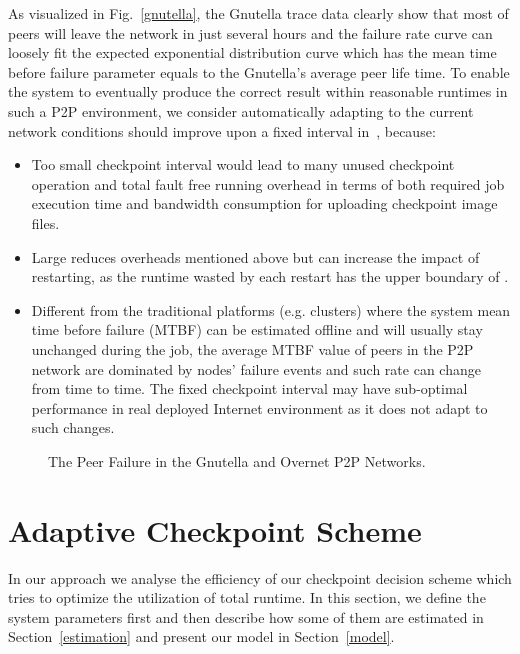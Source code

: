 \documentclass[times, 12pt, onecolumn]{article}
\newcommand{\refsec}[1]{Section~\ref{#1}}
\newcommand{\reffig}[1]{Fig.~\ref{#1}}
\begin{document}
As visualized in \reffig{gnutella}, the Gnutella trace data clearly show that most of peers 
will leave the network in just several hours and the failure rate curve can loosely fit the 
expected exponential distribution curve which has the mean time before failure parameter 
equals to the Gnutella's average peer life time. 
To enable the system to eventually produce the correct result within reasonable runtimes in such a
P2P environment, we consider automatically adapting to the current network conditions should improve upon
a fixed interval in~\cite{dvm}, because:
\begin{itemize}
\item Too small checkpoint interval  would lead to many unused checkpoint operation and total 
fault free running overhead in terms of both required job execution time and bandwidth consumption for
uploading checkpoint image files. 
\item Large  reduces overheads mentioned above but can increase the impact of restarting, as the
runtime wasted by each restart has the upper boundary of .
\item Different from the traditional platforms (e.g. clusters) where the system mean time before failure 
(MTBF) can be estimated offline and will usually stay unchanged during the job, the average MTBF value of 
peers in the P2P network are dominated by nodes' failure events and such rate can change from time to time. 
The fixed checkpoint interval  may have sub-optimal performance in real deployed Internet environment as it 
does not adapt to such changes. 
\end{itemize}

\begin{figure*}
\centering
{}
\caption{The Peer Failure in the Gnutella and Overnet P2P Networks.}
\label{failurerate}
\end{figure*}


\section{Adaptive Checkpoint Scheme}
\label{scheme}
In our approach we analyse the efficiency of our checkpoint decision scheme which tries to optimize the 
utilization of total runtime. In this section, we define the system parameters first and then describe 
how some of them are estimated in \refsec{estimation} and present our model in \refsec{model}.
\end{document}

